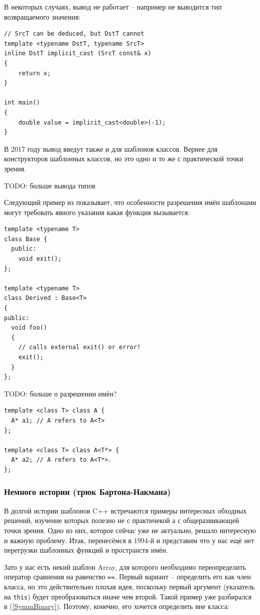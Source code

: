 \documentclass[a4paper,12pt,oneside]{article}
\begin{document}
В некоторых случаях, вывод не работает -- например не выводится тип возвращаемого значения:

\begin{lstlisting}
// SrcT can be deduced, but DstT cannot 
template <typename DstT, typename SrcT> 
inline DstT implicit_cast (SrcT const& x)  
{ 
    return x; 
} 

int main() 
{ 
    double value = implicit_cast<double>(-1); 
} 
\end{lstlisting}

В 2017 году вывод введут также и для шаблонов классов. Вернее для конструкторов шаблонных классов, но это одно и то же с практической точки зрения.

TODO: больше вывода типов

Следующий пример из \cite{vandervoord} показывает, что особенности разрешения имён шаблонами могут требовать явного указания какая функция вызывается:

\begin{lstlisting}
template <typename T> 
class Base { 
  public: 
    void exit(); 
};

template <typename T> 
class Derived : Base<T> 
{ 
public: 
  void foo() 
  { 
    // calls external exit() or error! 
    exit();   
  } 
}; 
\end{lstlisting}

TODO: больше о разрешении имён?

\begin{lstlisting}
template <class T> class A {
  A* a1; // A refers to A<T>
};

template <class T> class A<T*> {
  A* a2; // A refers to A<T*>.
};
\end{lstlisting}

\subsubsection{Немного истории (трюк Бартона-Накмана)}\label{BartonNackman}

В долгой истории шаблонов C++ встречаются примеры интересных обходных решений, изучение которых полезно не с практичекой а с общеразвивающей точки зрения. Одно из них, которое сейчас уже не актуально, решало интересную и важную проблему. Итак, перенесёмся в 1994-й и представим что у нас ещё нет перегрузки шаблонных функций и пространств имён.

Зато у нас есть некий шаблон Array, для которого необходимо переопределить оператор сравнения на равенство \lstinline!==!. Первый вариант -- определить его как член класса, но это действительно плохая идея, поскольку первый аргумент (указатель на \lstinline!this!) будет преобразоваться иначе чем второй. Такой пример уже разбирался в (\ref{SymmBinary}). Поэтому, конечно, его хочется определить вне класса:
\end{document}
